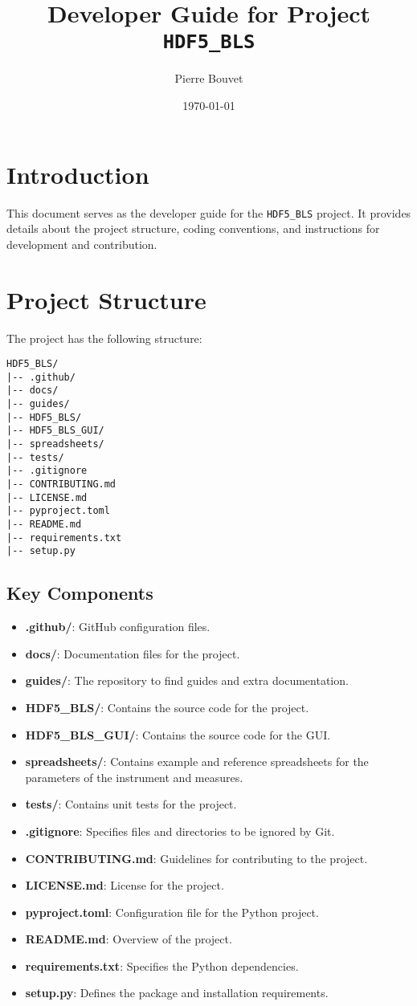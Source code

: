 \documentclass[a4paper,12pt]{article}
\title{Developer Guide for Project \texttt{HDF5\_BLS}}
\author{Pierre Bouvet}
\date{\today}
\begin{document}
\maketitle

\tableofcontents

\section{Introduction}
This document serves as the developer guide for the \texttt{HDF5\_BLS} project. It provides details about the project structure, coding conventions, and instructions for development and contribution.

\section{Project Structure}
The project has the following structure:
\begin{verbatim}
HDF5_BLS/
|-- .github/
|-- docs/
|-- guides/
|-- HDF5_BLS/
|-- HDF5_BLS_GUI/
|-- spreadsheets/
|-- tests/
|-- .gitignore
|-- CONTRIBUTING.md
|-- LICENSE.md
|-- pyproject.toml
|-- README.md
|-- requirements.txt
|-- setup.py
\end{verbatim}

\subsection{Key Components}
\begin{itemize}
    \item \textbf{.github/}: GitHub configuration files.
    \item \textbf{docs/}: Documentation files for the project.
    \item \textbf{guides/}: The repository to find guides and extra documentation.
    \item \textbf{HDF5\_BLS/}: Contains the source code for the project.
    \item \textbf{HDF5\_BLS\_GUI/}: Contains the source code for the GUI.
    \item \textbf{spreadsheets/}: Contains example and reference spreadsheets for the parameters of the instrument and measures.
    \item \textbf{tests/}: Contains unit tests for the project.
    \item \textbf{.gitignore}: Specifies files and directories to be ignored by Git.
    \item \textbf{CONTRIBUTING.md}: Guidelines for contributing to the project.
    \item \textbf{LICENSE.md}: License for the project.
    \item \textbf{pyproject.toml}: Configuration file for the Python project.
    \item \textbf{README.md}: Overview of the project.
    \item \textbf{requirements.txt}: Specifies the Python dependencies.
    \item \textbf{setup.py}: Defines the package and installation requirements.
\end{itemize}
\end{document}
